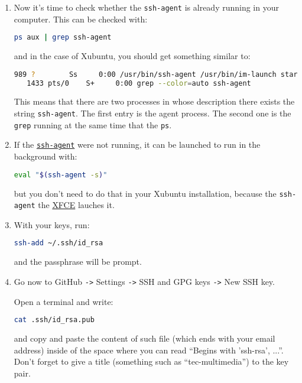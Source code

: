 \begin{enumerate}
\item Now it's time to check whether the \texttt{ssh-agent} is already
  running in your computer. This can be checked with:

  \begin{lstlisting}[language=bash]
    ps aux | grep ssh-agent
  \end{lstlisting}

  and in the case of Xubuntu, you should get something similar to:

  \begin{lstlisting}[language=bash]
    989 ?        Ss     0:00 /usr/bin/ssh-agent /usr/bin/im-launch startxfce4
   1433 pts/0    S+     0:00 grep --color=auto ssh-agent
  \end{lstlisting}

  This means that there are two processes in whose description there
  exists the string \texttt{ssh-agent}. The first entry is the agent
  process. The second one is the \texttt{grep} running at the same
  time that the \texttt{ps}.

\item If the \href{https://www.ssh.com/ssh/agent}{\texttt{ssh-agent}}
  were not running, it can be launched to run in the background with:

  \begin{lstlisting}[language=bash]
    eval "$(ssh-agent -s)"
  \end{lstlisting}

  but you don't need to do that in your Xubuntu installation, because
  the \texttt{ssh-agent} the \href{https://www.xfce.org/}{XFCE}
  lauches it.

\item With your keys, run:

  \begin{lstlisting}[language=bash]  
    ssh-add ~/.ssh/id_rsa
  \end{lstlisting}

  and the passphrase will be prompt.
  
\item Go now to GitHub \texttt{->} Settings \texttt{->} SSH and GPG keys \texttt{->} New SSH key.

  Open a terminal and write:
  
  \begin{lstlisting}[language=bash]  
    cat .ssh/id_rsa.pub
  \end{lstlisting}

  and copy and paste the content of such file (which ends with your
  email address) inside of the space where you can read ``Begins with
  'ssh-rsa', ...''. Don't forget to give a title (something such as
  ``tec-multimedia'') to the key pair.
  

\end{enumerate}
